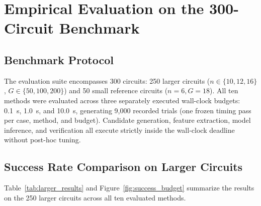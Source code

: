 \documentclass[11pt]{article}
\begin{document}
\section{Empirical Evaluation on the 300-Circuit Benchmark}
\label{sec:results}

\subsection{Benchmark Protocol}
The evaluation suite encompasses 300 circuits: 250 larger circuits ($n \in \{10, 12, 16\}$, $G \in \{50, 100, 200\}$) and 50 small reference circuits ($n=6, G=18$). All ten methods were evaluated across three separately executed wall-clock budgets: 0.1~s, 1.0~s, and 10.0~s, generating 9,000 recorded trials (one frozen timing pass per case, method, and budget). Candidate generation, feature extraction, model inference, and verification all execute strictly inside the wall-clock deadline without post-hoc tuning.

\subsection{Success Rate Comparison on Larger Circuits}
Table~\ref{tab:larger_results} and Figure~\ref{fig:success_budget} summarize the results on the 250 larger circuits across all ten evaluated methods.

\begin{table}[t]
\caption{Repair Success Across Execution Budgets on Larger Circuits ($N=250$)}
\label{tab:larger_results}
\centering
{}
\end{table}
\end{document}
